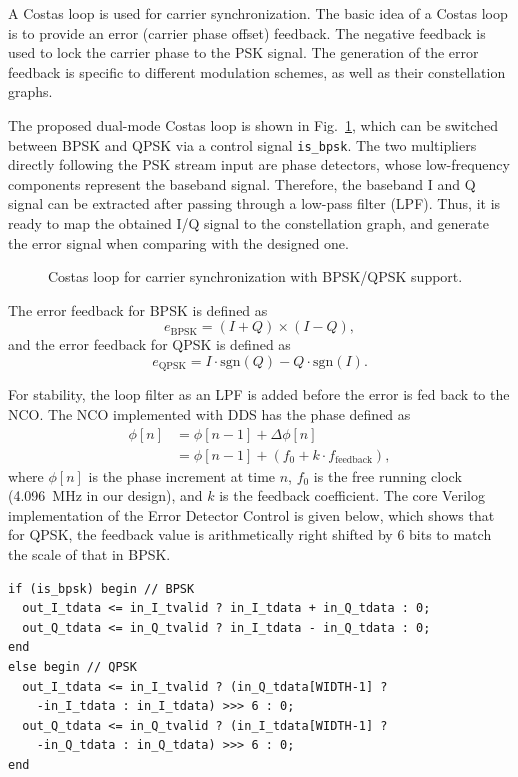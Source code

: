 \documentclass[journal,twoside]{IEEEtran}
\begin{document}
      A Costas loop \cite{simon1977optimum} is used for carrier synchronization.
      The basic idea of a Costas loop is to provide an error (carrier phase offset) feedback.
      The negative feedback is used to lock the carrier phase to the PSK signal.
      The generation of the error feedback is specific to different modulation schemes,
      as well as their constellation graphs.

      The proposed dual-mode Costas loop is shown in Fig.~\ref{fig:costas_loop},
      which can be switched between BPSK and QPSK via a control signal \texttt{is\_bpsk}.
      The two multipliers directly following the PSK stream input are phase detectors,
      whose low-frequency components represent the baseband signal.
      Therefore, the baseband I and Q signal can be extracted after passing through a low-pass filter (LPF).
      Thus, it is ready to map the obtained I/Q signal to the constellation graph,
      and generate the error signal when comparing with the designed one.
      \begin{figure}[htbp]
        \centering
        
        \caption{Costas loop for carrier synchronization with BPSK/QPSK support.}
        \label{fig:costas_loop}
      \end{figure}

      The error feedback for BPSK is defined as
      \begin{equation}
        e_{\text{BPSK}}=(I+Q)\times(I-Q),
      \end{equation}
      and the error feedback for QPSK is defined as
      \begin{equation}
        e_{\text{QPSK}}=I\cdot\mathrm{sgn}(Q)-Q\cdot\mathrm{sgn}(I).
      \end{equation}

      For stability, the loop filter as an LPF is added before the error is fed back to the NCO.     
      The NCO implemented with DDS has the phase defined as
      \begin{equation}
        \begin{aligned}
          \phi[n]&=\phi[n-1]+\Delta\phi[n]\\
          &=\phi[n-1]+(f_0+k\cdot f_{\text{feedback}}),
        \end{aligned}
      \end{equation}
      where $\phi[n]$ is the phase increment at time $n$,
      $f_0$ is the free running clock (\qty{4.096}{MHz} in our design),
      and $k$ is the feedback coefficient.
      The core Verilog implementation of the Error Detector Control is given below,
      which shows that for QPSK, the feedback value is arithmetically right shifted by 6 bits
      to match the scale of that in BPSK.
      \begin{verbatim}
if (is_bpsk) begin // BPSK
  out_I_tdata <= in_I_tvalid ? in_I_tdata + in_Q_tdata : 0;
  out_Q_tdata <= in_Q_tvalid ? in_I_tdata - in_Q_tdata : 0;
end
else begin // QPSK
  out_I_tdata <= in_I_tvalid ? (in_Q_tdata[WIDTH-1] ?
    -in_I_tdata : in_I_tdata) >>> 6 : 0;
  out_Q_tdata <= in_Q_tvalid ? (in_I_tdata[WIDTH-1] ?
    -in_Q_tdata : in_Q_tdata) >>> 6 : 0;
end
      \end{verbatim}
      
\end{document}
